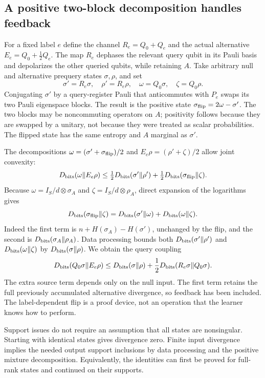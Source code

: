 \documentclass[11pt,a4paper]{article}
\numberwithin{equation}{section}
\theoremstyle{definition}
\theoremstyle{remark}
\begin{document}
\subsection{A positive two-block decomposition handles feedback}

For a fixed label $e$ define the channel $R_e=Q_0+Q_e$ and the actual
alternative $E_e=Q_0+\tfrac12Q_e$. The map $R_e$ dephases the relevant
query qubit in its Pauli basis and depolarizes the other queried qubits,
while retaining $A$. Take arbitrary null and alternative prequery states
$\sigma,\rho$, and set
\[
 \sigma'=R_e\sigma,\quad \rho'=R_e\rho,\quad
 \omega=Q_0\sigma,\quad \zeta=Q_0\rho.
\]
Conjugating $\sigma'$ by a query-register Pauli that anticommutes with $P_e$
swaps its two Pauli eigenspace blocks. The result is the positive state
$\sigma_{\rm flip}=2\omega-\sigma'$. The two blocks may be noncommuting
operators on $A$; positivity follows because they are swapped by a unitary,
not because they were treated as scalar probabilities. The flipped state has
the same entropy and $A$ marginal as $\sigma'$.

The decompositions
$\omega=(\sigma'+\sigma_{\rm flip})/2$ and
$E_e\rho=(\rho'+\zeta)/2$ allow joint convexity:
\[
 D_{\rm bits}(\omega\Vert E_e\rho)
 \leq\tfrac12D_{\rm bits}(\sigma'\Vert\rho')
       +\tfrac12D_{\rm bits}(\sigma_{\rm flip}\Vert\zeta).
\]
Because $\omega=I_S/d\otimes\sigma_A$ and
$\zeta=I_S/d\otimes\rho_A$, direct expansion of the logarithms gives
\[
 D_{\rm bits}(\sigma_{\rm flip}\Vert\zeta)
   =D_{\rm bits}(\sigma'\Vert\omega)
      +D_{\rm bits}(\omega\Vert\zeta).
\]
Indeed the first term is $n+H(\sigma_A)-H(\sigma')$, unchanged by the
flip, and the second is $D_{\rm bits}(\sigma_A\Vert\rho_A)$.
Data processing bounds both
$D_{\rm bits}(\sigma'\Vert\rho')$ and
$D_{\rm bits}(\omega\Vert\zeta)$ by
$D_{\rm bits}(\sigma\Vert\rho)$. We obtain the query coupling
\begin{equation}
 D_{\rm bits}(Q_0\sigma\Vert E_e\rho)
 \leq D_{\rm bits}(\sigma\Vert\rho)
       +\frac12D_{\rm bits}(R_e\sigma\Vert Q_0\sigma).
 \label{q:entropy-query-coupling}
\end{equation}
The extra source term depends only on the null input. The first term retains
the full previously accumulated alternative divergence, so feedback has been
included. The label-dependent flip is a proof device, not an operation that
the learner knows how to perform.

Support issues do not require an assumption that all states are nonsingular.
Starting with identical states gives divergence zero. Finite input divergence
implies the needed output support inclusions by data processing and the
positive mixture decomposition. Equivalently, the identities can first be
proved for full-rank states and continued on their supports.
\end{document}

